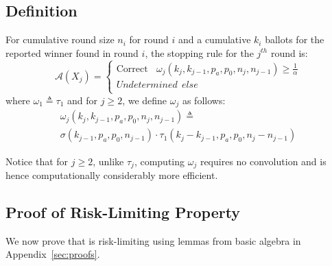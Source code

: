 \subsection{Definition}
\label{sec:prov_def}
\begin{definition}
    \label{def:minervatwo}
    For cumulative round size $n_i$ for round $i$ and a cumulative $k_i$ ballots for the reported winner found in round $i$, the \R \Providence stopping rule for the $j^{th}$ round is:
$$
\mathcal{A}(X_{j})=  \left\{ \begin{array}{ll} \text{Correct} ~~~~ \omega_{j}(k_{j}, k_{j-1}, p_a, p_0, n_j, n_{j-1}) \geq \frac{1}{\alpha}\\
        Undetermined ~~else \\
    \end{array}
    \right .
$$
where $\omega _{1}\triangleq \tau_{1}$ and for $j\ge 2$, we define $\omega _{j}$ as follows:
\begin{equation}
    \begin{aligned}
    \omega_{j}(k_{j}, k_{j-1}, p_a, p_0, n_{j}, n_{j-1})
    \triangleq\\
    \sigma(k_{j-1},p_a,p_0,n_{j-1})\cdot \tau_1(k_{j}-k_{j-1},p_a,p_0,n_j-n_{j-1})
    \end{aligned}
\end{equation}
\end{definition}

Notice that for $j\ge 2$, unlike $\tau_j$, computing $\omega_j$ requires no convolution and is hence computationally considerably more efficient. 

\subsection{Proof of Risk-Limiting Property}
\label{sec:proof}
We now prove that \Providence is risk-limiting using lemmas from basic algebra in Appendix~\ref{sec:proofs}.

